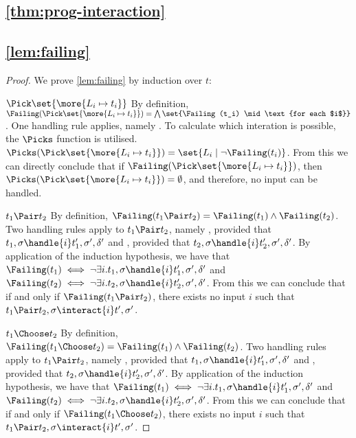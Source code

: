 \subsection{\cref{thm:prog-interaction}}


\subsection{\cref{lem:failing}}

\begin{proof}
    We prove \cref{lem:failing} by induction over $t$:

\case
  {$\Pick \set{\more{L_i \mapsto t_i}}$}
  {By definition, $\Failing(\Pick \set{\more{L_i \mapsto t_i}}) = \bigwedge \set{\Failing(t_i) \mid \text{for each $i$}}$.
  One handling rule applies, namely . To calculate which interation is possible, the $\Picks$ function is utilised. $\Picks(\Pick \set{\more{L_i \mapsto t_i}}) = \set{L_i \mid \lnot\Failing(t_i)}$.
  From this we can directly conclude that if $\Failing(\Pick \set{\more{L_i \mapsto t_i}})$, then $\Picks(\Pick \set{\more{L_i \mapsto t_i}}) =\emptyset$, and therefore, no input can be handled.}

\case
  {$t_1 \Pair t_2$}
  {By definition, $\Failing(t_1 \Pair t_2) = \Failing(t_1) \land \Failing(t_2)$. Two handling rules apply to $t_1 \Pair t_2$, namely , provided that $t_1,\sigma\handle{i}t_1',\sigma',\delta'$ and , provided that $t_2,\sigma\handle{i}t_2',\sigma',\delta'$.
  By application of the induction hypothesis, we have that $\Failing(t_1)\iff \neg\exists i . t_1,\sigma\handle{i}t_1',\sigma',\delta'$ and $\Failing(t_2)\iff \neg\exists i . t_2,\sigma\handle{i}t_2',\sigma',\delta'$.
  From this we can conclude that if and only if $\Failing(t_1 \Pair t_2)$, there exists no input $i$ such that $t_1 \Pair t_2,\sigma\interact{i} t',\sigma'$.}

\case
  {$t_1 \Choose t_2$}
  {By definition, $\Failing(t_1 \Choose t_2) = \Failing(t_1) \land \Failing(t_2)$. Two handling rules apply to $t_1 \Pair t_2$, namely , provided that $t_1,\sigma\handle{i}t_1',\sigma',\delta'$ and , provided that $t_2,\sigma\handle{i}t_2',\sigma',\delta'$.
  By application of the induction hypothesis, we have that $\Failing(t_1)\iff \neg\exists i . t_1,\sigma\handle{i}t_1',\sigma',\delta'$ and $\Failing(t_2)\iff \neg\exists i . t_2,\sigma\handle{i}t_2',\sigma',\delta'$.
  From this we can conclude that if and only if $\Failing(t_1 \Choose t_2)$, there exists no input $i$ such that $t_1 \Pair t_2,\sigma\interact{i} t',\sigma'$.}


\end{proof}
